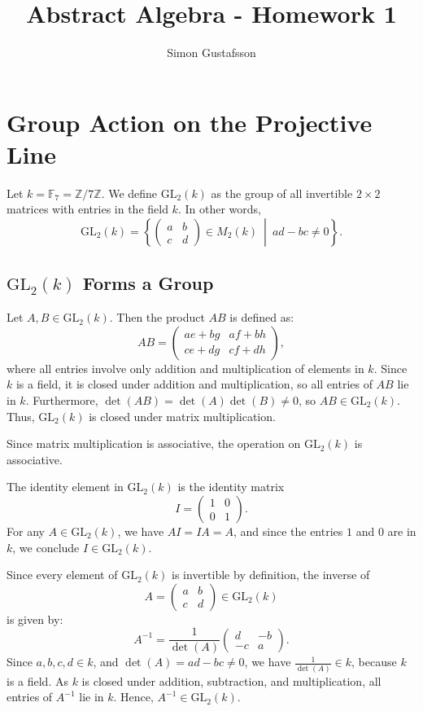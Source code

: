 \documentclass[12pt]{article}
\title{Abstract Algebra - Homework 1}
\author{Simon Gustafsson}
\date{}
\begin{document}
\maketitle
\section{Group Action on the Projective Line}

Let \( k = \mathbb{F}_7 = \mathbb{Z}/7\mathbb{Z} \). We define \( \mathrm{GL}_2(k) \) as the group of all invertible \( 2 \times 2 \) matrices with entries in the field \( k \). In other words,
\[
\mathrm{GL}_2(k) = \left\{ \begin{pmatrix} a & b \\ c & d \end{pmatrix} \in M_2(k) \ \middle| \ ad - bc \neq 0 \right\}.
\]

\subsection*{\(\mathrm{GL}_2(k)\) Forms a Group}

Let \( A, B \in \mathrm{GL}_2(k) \). Then the product \( AB \) is defined as:
\[
AB = \begin{pmatrix}
ae + bg & af + bh \\
ce + dg & cf + dh
\end{pmatrix},
\]
where all entries involve only addition and multiplication of elements in \( k \). Since \( k \) is a field, it is closed under addition and multiplication, so all entries of \( AB \) lie in \( k \). Furthermore, \( \det(AB) = \det(A)\det(B) \neq 0 \), so \( AB \in \mathrm{GL}_2(k) \). Thus, \( \mathrm{GL}_2(k) \) is closed under matrix multiplication.

Since matrix multiplication is associative, the operation on \( \mathrm{GL}_2(k) \) is associative.

The identity element in \( \mathrm{GL}_2(k) \) is the identity matrix
\[
I = \begin{pmatrix} 1 & 0 \\ 0 & 1 \end{pmatrix}.
\]
For any \( A \in \mathrm{GL}_2(k) \), we have \( AI = IA = A \), and since the entries \( 1 \) and \( 0 \) are in \( k \), we conclude \( I \in \mathrm{GL}_2(k) \).

Since every element of \( \mathrm{GL}_2(k) \) is invertible by definition, the inverse of
\[
A = \begin{pmatrix} a & b \\ c & d \end{pmatrix} \in \mathrm{GL}_2(k)
\]
is given by:
\[
A^{-1} = \frac{1}{\det(A)} \begin{pmatrix} d & -b \\ -c & a \end{pmatrix}.
\]
Since \( a, b, c, d \in k \), and \( \det(A) = ad - bc \neq 0 \), we have \( \frac{1}{\det(A)} \in k \), because \( k \) is a field. As \( k \) is closed under addition, subtraction, and multiplication, all entries of \( A^{-1} \) lie in \( k \). Hence, \( A^{-1} \in \mathrm{GL}_2(k) \).
\end{document}

